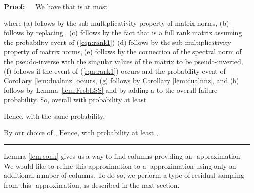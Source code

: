 \documentclass[11pt]{article}
\newcommand{\FNormS}[1]{\mbox{}\|#1\|_\mathrm{F}^2}
\newcommand{\TNormS}[1]{\mbox{}\|#1\|_2^2}
\newenvironment{proof}{\begin{trivlist} \item {\bf Proof:~~}}
  {\qed\end{trivlist}}
\newcommand{\transp}{^{\textsc{T}}}
\newcommand{\mat}[1]{{\ensuremath{\bm{\mathrm{#1}}}}}
\def\matD{\mat{D}}
\def\matE{\mat{E}}
\def\matM{\mat{M}}
\def\matS{\mat{S}}
\def\matU{\mat{U}}
\def\matV{\mat{V}}
\def\matZ{\mat{Z}}
\def\matOmega{\mat{\Omega}}
\def\matSig{\mat{\Sigma}}
\def\matOmega{\mat{\Omega}}
\def\matSig{\mat{\Sigma}}
\def\frac#1#2{{#1\over #2}}
\def\eqan#1{}
\def\qed{\hfill\rule{2mm}{2mm}}
\begin{document}
\begin{proof}
We have that  is
at most
\eqan{
&\buildrel(a)\over\le& \FNormS{\matE_1 \matOmega_1 \matD_1 \matS_1} \cdot \TNormS{(\matZ_1\matOmega_1 \matD_1 \matS_1)^{\dagger}} \\
&\buildrel(b)\over=  & \FNormS{\matE_1 \matOmega_1 \matD_1 \matS_1} \cdot \TNormS{(\matU_{\matM} \matSig_{\matM} \matV_{\matM}\transp \matS_1)^{\dagger}} \\
&\buildrel(c)\over=  & \FNormS{\matE_1 \matOmega_1 \matD_1 \matS_1} \cdot \TNormS{ \left(\matV_{\matM}\transp \matS_1\right)^{\dagger} \left( \matU_{\matM} \matSig_{\matM} \right)^{\dagger}} \\
&\buildrel(d)\over\le& \FNormS{\matE_1 \matOmega_1 \matD_1 \matS_1} \cdot \TNormS{ \left(\matV_{\matM}\transp \matS_1\right)^{\dagger}} \cdot \TNormS{ \left( \matU_{\matM} \matSig_{\matM} \right)^{\dagger}}  \\
&\buildrel(e)\over=  & \FNormS{\matE_1 \matOmega_1 \matD_1 \matS_1}  \cdot \frac{1}{ \sigma_k^2\left(\matV_{\matM}\transp \matS_1\right)}  \cdot \frac{1}{ \sigma_k^2\left( \matU_{\matM} \matSig_{\matM} \right)} \\
&\buildrel(f)\over\le & \FNormS{\matE_1 \matOmega_1 \matD_1 \matS_1} \cdot 8 \\
&\buildrel(g)\over\le&  \FNormS{\matE_1 \matOmega_1 \matD_1} \cdot 8 \\
&\buildrel(h)\over\le& 80 \FNormS{\matE_1}
}
where
(a) follows by the sub-multiplicativity property of matrix norms,
(b) follows by replacing ,
(c) follows by the fact that  is a full rank  matrix
assuming the  probability event of (\ref{eqn:rank1})
(d) follows by the sub-multiplicativity property of matrix norms,
(e) follows by the 
connection of the spectral norm of the pseudo-inverse with the singular values of the matrix to be pseudo-inverted,
(f) follows if the  event of (\ref{eqn:rank1}) occurs and the probability  event of 
Corollary \ref{lem:dualnnz} occurs, 
(g) follows by Corollary \ref{lem:dualnnz}, and
(h) follows by Lemma~\ref{lem:FrobLSS} and by adding a  to the overall failure probability.
So, overall with probability at least 

Hence,
with the same probability,

By our choice of , 
Hence, with probability at least ,

\end{proof}

Lemma \ref{lem:conk} gives us a way to find  columns providing an -approximation. We would like
to refine this approximation to a -approximation using only an additional  number of columns.
To do so, we perform a type of residual sampling from this -approximation, as described in the next section.
\end{document}
